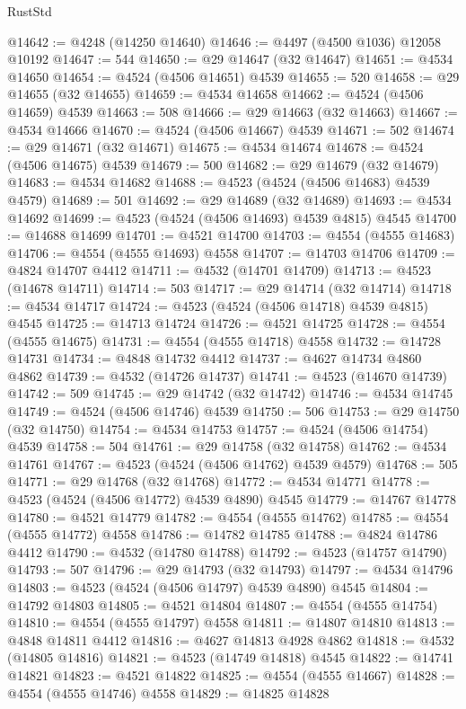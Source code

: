 \begin{lexlean}{RustStd}
\begin{coremodule}
@14642 := @4248 (@14250 @14640)
@14646 := @4497 (@4500 @1036) @12058 @10192
@14647 := 544
@14650 := @29 @14647 (@32 @14647)
@14651 := @4534 @14650
@14654 := @4524 (@4506 @14651) @4539
@14655 := 520
@14658 := @29 @14655 (@32 @14655)
@14659 := @4534 @14658
@14662 := @4524 (@4506 @14659) @4539
@14663 := 508
@14666 := @29 @14663 (@32 @14663)
@14667 := @4534 @14666
@14670 := @4524 (@4506 @14667) @4539
@14671 := 502
@14674 := @29 @14671 (@32 @14671)
@14675 := @4534 @14674
@14678 := @4524 (@4506 @14675) @4539
@14679 := 500
@14682 := @29 @14679 (@32 @14679)
@14683 := @4534 @14682
@14688 := @4523 (@4524 (@4506 @14683) @4539 @4579)
@14689 := 501
@14692 := @29 @14689 (@32 @14689)
@14693 := @4534 @14692
@14699 := @4523 (@4524 (@4506 @14693) @4539 @4815) @4545
@14700 := @14688 @14699
@14701 := @4521 @14700
@14703 := @4554 (@4555 @14683)
@14706 := @4554 (@4555 @14693) @4558
@14707 := @14703 @14706
@14709 := @4824 @14707 @4412
@14711 := @4532 (@14701 @14709)
@14713 := @4523 (@14678 @14711)
@14714 := 503
@14717 := @29 @14714 (@32 @14714)
@14718 := @4534 @14717
@14724 := @4523 (@4524 (@4506 @14718) @4539 @4815) @4545
@14725 := @14713 @14724
@14726 := @4521 @14725
@14728 := @4554 (@4555 @14675)
@14731 := @4554 (@4555 @14718) @4558
@14732 := @14728 @14731
@14734 := @4848 @14732 @4412
@14737 := @4627 @14734 @4860 @4862
@14739 := @4532 (@14726 @14737)
@14741 := @4523 (@14670 @14739)
@14742 := 509
@14745 := @29 @14742 (@32 @14742)
@14746 := @4534 @14745
@14749 := @4524 (@4506 @14746) @4539
@14750 := 506
@14753 := @29 @14750 (@32 @14750)
@14754 := @4534 @14753
@14757 := @4524 (@4506 @14754) @4539
@14758 := 504
@14761 := @29 @14758 (@32 @14758)
@14762 := @4534 @14761
@14767 := @4523 (@4524 (@4506 @14762) @4539 @4579)
@14768 := 505
@14771 := @29 @14768 (@32 @14768)
@14772 := @4534 @14771
@14778 := @4523 (@4524 (@4506 @14772) @4539 @4890) @4545
@14779 := @14767 @14778
@14780 := @4521 @14779
@14782 := @4554 (@4555 @14762)
@14785 := @4554 (@4555 @14772) @4558
@14786 := @14782 @14785
@14788 := @4824 @14786 @4412
@14790 := @4532 (@14780 @14788)
@14792 := @4523 (@14757 @14790)
@14793 := 507
@14796 := @29 @14793 (@32 @14793)
@14797 := @4534 @14796
@14803 := @4523 (@4524 (@4506 @14797) @4539 @4890) @4545
@14804 := @14792 @14803
@14805 := @4521 @14804
@14807 := @4554 (@4555 @14754)
@14810 := @4554 (@4555 @14797) @4558
@14811 := @14807 @14810
@14813 := @4848 @14811 @4412
@14816 := @4627 @14813 @4928 @4862
@14818 := @4532 (@14805 @14816)
@14821 := @4523 (@14749 @14818) @4545
@14822 := @14741 @14821
@14823 := @4521 @14822
@14825 := @4554 (@4555 @14667)
@14828 := @4554 (@4555 @14746) @4558
@14829 := @14825 @14828

\end{coremodule}
\end{lexlean}
